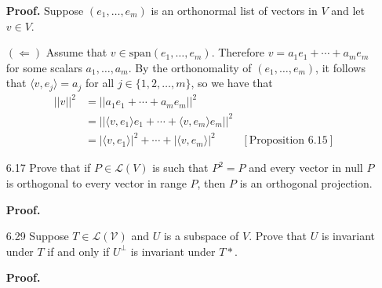 \documentclass[9pt]{article}
\newcommand{\cyc}[1]{\langle #1 \rangle}
\begin{document}
\begin{enumerate}
      \textbf{Proof.} Suppose $(e_1, \ldots, e_m)$ is an orthonormal list of
      vectors in $V$ and let $v \in V$.
      
      $(\Leftarrow)$ Assume that $v \in \text{span}(e_1, \ldots, e_m)$.
      Therefore $v = a_1e_1 + \cdots + a_me_m$ for some scalars
      $a_1, \ldots, a_m$. By the orthonomality of $(e_1, \ldots, e_m)$, it
      follows that $\cyc{v, e_j} = a_j$ for all $j \in \{1, 2,  \ldots, m\}$, so
      we have that
      \begin{align*}
         ||v||^2 &= ||a_1e_1 + \cdots + a_me_m||^2 \\
                 &= ||\cyc{v, e_1}e_1 + \cdots + \cyc{v, e_m}e_m||^2 \\
                 &= |\cyc{v, e_1}|^2 + \cdots + |\cyc{v, e_m}|^2
                    &[\text{Proposition }6.15]
      \end{align*}
   \item[6.17] Prove that if $P \in \mathcal{L}(V)$ is such that $P^2 = P$ and
               every vector in null $P$ is orthogonal to every vector in range
               $P$, then $P$ is an orthogonal projection.
               
      \textbf{Proof.}
   \item[6.29] Suppose $T \in \mathcal{L(V)}$ and $U$ is a subspace of $V$.
               Prove that $U$ is invariant under $T$ if and only if $U^\perp$
               is invariant under $T*$.
               
      \textbf{Proof.}
\end{enumerate}
\end{document}
